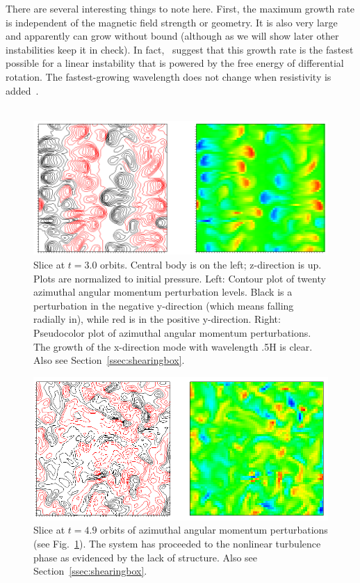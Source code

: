 There are several interesting things to note here. First, the maximum growth rate is independent of the magnetic field strength or geometry. It is also very large and apparently can grow without bound (although as we will show later other instabilities keep it in check). In fact,~\citet{Balbus1992} suggest that this growth rate is the fastest possible for a linear instability that is powered by the free energy of differential rotation. The fastest-growing wavelength does not change when resistivity is added~\cite{BH1998}. \\
\\
\begin{figure}
  \begin{center}  
    \includegraphics[width=\textwidth, angle=0.]{img/ideal-R1L1-dVy-xz-t30-contpseudo-2.png}
  \end{center}
  \caption{Slice at $t=3.0$ orbits. Central body is on the left; z-direction is up. Plots are normalized to initial pressure. Left: Contour plot of twenty azimuthal angular momentum perturbation levels. Black is a perturbation in the negative y-direction (which means falling radially in), while red is in the positive y-direction. Right: Pseudocolor plot of azimuthal angular momentum perturbations. The growth of the x-direction mode with wavelength .5H is clear. Also see Section~\ref{ssec:shearingbox}.}
  \label{fig:idealgrowth}
\end{figure}
\begin{figure}
  \begin{center}  
    \includegraphics [width=\textwidth, angle=0.]{img/ideal-R1L1-01-dVy-xz-t49-2.png}
  \end{center}
  \caption{Slice at $t=4.9$ orbits of azimuthal angular momentum perturbations (see Fig.~\ref{fig:idealgrowth}). The system has proceeded to the nonlinear turbulence phase as evidenced by the lack of structure. Also see Section~\ref{ssec:shearingbox}.}
  \label{fig:idealturb}
\end{figure}
